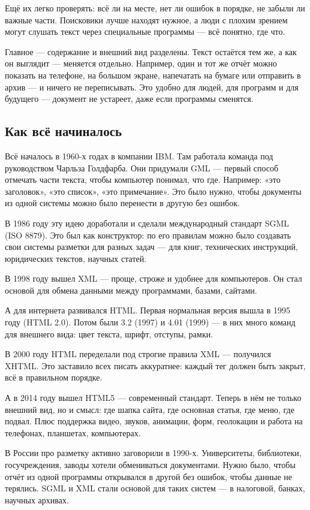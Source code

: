 \documentclass{ou}
\begin{document}
Ещё их легко проверять: всё ли на месте, нет ли ошибок в порядке, не забыли ли важные части. Поисковики лучше находят нужное, а люди с плохим зрением могут слушать текст через специальные программы — всё понятно, где что.

Главное — содержание и внешний вид разделены. Текст остаётся тем же, а как он выглядит — меняется отдельно. Например, один и тот же отчёт можно показать на телефоне, на большом экране, напечатать на бумаге или отправить в архив — и ничего не переписывать. Это удобно для людей, для программ и для будущего — документ не устареет, даже если программы сменятся.
\newpage
\subsection{Как всё начиналось}
Всё началось в 1960-х годах в компании IBM. Там работала команда под руководством Чарльза Голдфарба. Они придумали GML — первый способ отмечать части текста, чтобы компьютер понимал, что где. Например: «это заголовок», «это список», «это примечание». Это было нужно, чтобы документы из одной системы можно было перенести в другую без ошибок.

В 1986 году эту идею доработали и сделали международный стандарт SGML (ISO 8879). Это был как конструктор: по его правилам можно было создавать свои системы разметки для разных задач — для книг, технических инструкций, юридических текстов, научных статей.

В 1998 году вышел XML — проще, строже и удобнее для компьютеров. Он стал основой для обмена данными между программами, базами, сайтами.

А для интернета развивался HTML. Первая нормальная версия вышла в 1995 году (HTML 2.0). Потом были 3.2 (1997) и 4.01 (1999) — в них много команд для внешнего вида: цвет текста, шрифт, отступы, рамки.

В 2000 году HTML переделали под строгие правила XML — получился XHTML. Это заставило всех писать аккуратнее: каждый тег должен быть закрыт, всё в правильном порядке.

А в 2014 году вышел HTML5 — современный стандарт. Теперь в нём не только внешний вид, но и смысл: где шапка сайта, где основная статья, где меню, где подвал. Плюс поддержка видео, звуков, анимации, форм, геолокации и работа на телефонах, планшетах, компьютерах.

В России про разметку активно заговорили в 1990-х. Университеты, библиотеки, госучреждения, заводы хотели обмениваться документами. Нужно было, чтобы отчёт из одной программы открывался в другой без ошибок, чтобы данные не терялись. SGML и XML стали основой для таких систем — в налоговой, банках, научных архивах.
\newpage
\end{document}
